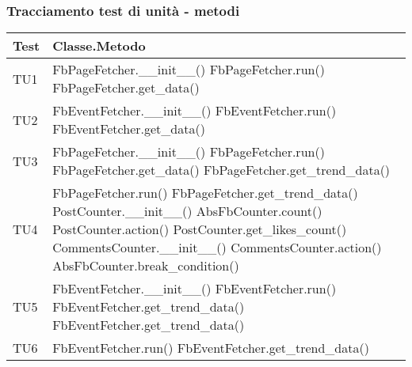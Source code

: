 		\subsubsection{Tracciamento test di unità - metodi}
			\begin{center}

			\def\arraystretch{1.5}
			\bgroup
			\begin{longtable}{| p{3cm} | p{9.5cm} |}
					\hline
					\textbf{Test} & \textbf{Classe.Metodo}\\
					\hline						
					TU1 & FbPageFetcher.\_\_init\_\_() \newline
					FbPageFetcher.run() \newline
					FbPageFetcher.get\_data() \\
					\hline
					TU2 & FbEventFetcher.\_\_init\_\_() \newline
					FbEventFetcher.run() \newline
					FbEventFetcher.get\_data() \\
					\hline
					TU3 & FbPageFetcher.\_\_init\_\_() \newline
					FbPageFetcher.run() \newline
					FbPageFetcher.get\_data() \newline
					FbPageFetcher.get\_trend\_data() \\
					\hline
					TU4 & FbPageFetcher.run() \newline
					FbPageFetcher.get\_trend\_data() \newline
					PostCounter.\_\_init\_\_() \newline
					AbsFbCounter.count() \newline
					PostCounter.action() \newline
					PostCounter.get\_likes\_count() \newline
					CommentsCounter.\_\_init\_\_() \newline
					CommentsCounter.action() \newline
					AbsFbCounter.break\_condition()\\
					\hline
					TU5 & FbEventFetcher.\_\_init\_\_() \newline
					FbEventFetcher.run() \newline
					FbEventFetcher.get\_trend\_data() \newline
					FbEventFetcher.get\_trend\_data() \\
					\hline
					TU6 & FbEventFetcher.run() \newline
					FbEventFetcher.get\_trend\_data() \newline

\end{longtable}
\end{center}
